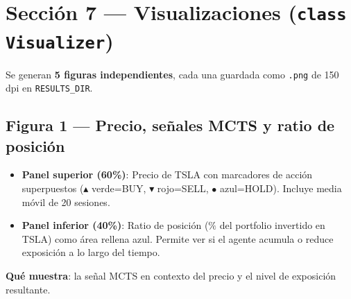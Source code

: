 \documentclass[12pt, a4paper]{article}
\begin{document}
\section{Sección 7 --- Visualizaciones (\texttt{class Visualizer})}

Se generan \textbf{5 figuras independientes}, cada una guardada como
\texttt{.png} de 150 dpi en \texttt{RESULTS\_DIR}.

\subsection{Figura 1 --- Precio, señales MCTS y ratio de posición}

\begin{tcolorbox}[figura, title={Fig.\ 1: \texttt{fig1\_signals.png}}]
\begin{itemize}\small
  \item \textbf{Panel superior (60\%)}: Precio de TSLA con marcadores de acción
        superpuestos ($\blacktriangle$ verde=BUY, $\blacktriangledown$ rojo=SELL,
        $\bullet$ azul=HOLD). Incluye media móvil de 20 sesiones.
  \item \textbf{Panel inferior (40\%)}: Ratio de posición ($\%$ del portfolio
        invertido en TSLA) como área rellena azul. Permite ver si el agente
        acumula o reduce exposición a lo largo del tiempo.
\end{itemize}
\textbf{Qué muestra}: la señal MCTS en contexto del precio y el nivel de
exposición resultante.
\end{tcolorbox}
\end{document}
